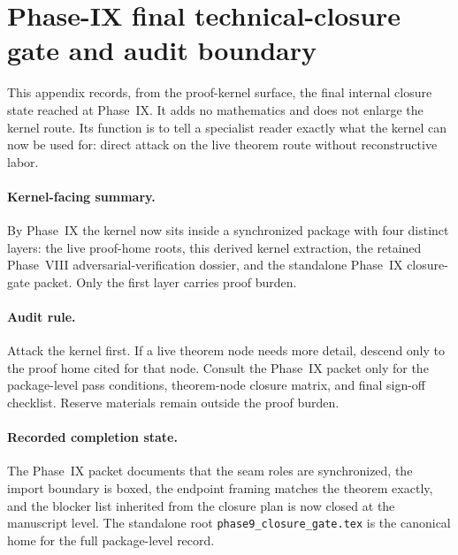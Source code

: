 \section{Phase-IX final technical-closure gate and audit boundary}\label{app:kernel-phase9}

This appendix records, from the proof-kernel surface, the final internal closure state reached at Phase~IX. It adds no mathematics and does not enlarge the kernel route. Its function is to tell a specialist reader exactly what the kernel can now be used for: direct attack on the live theorem route without reconstructive labor.

\paragraph{Kernel-facing summary.}
By Phase~IX the kernel now sits inside a synchronized package with four distinct layers: the live proof-home roots, this derived kernel extraction, the retained Phase~VIII adversarial-verification dossier, and the standalone Phase~IX closure-gate packet. Only the first layer carries proof burden.

\paragraph{Audit rule.}
Attack the kernel first. If a live theorem node needs more detail, descend only to the proof home cited for that node. Consult the Phase~IX packet only for the package-level pass conditions, theorem-node closure matrix, and final sign-off checklist. Reserve materials remain outside the proof burden.

\paragraph{Recorded completion state.}
The Phase~IX packet documents that the seam roles are synchronized, the import boundary is boxed, the endpoint framing matches the theorem exactly, and the blocker list inherited from the closure plan is now closed at the manuscript level. The standalone root \texttt{phase9\_closure\_gate.tex} is the canonical home for the full package-level record.
